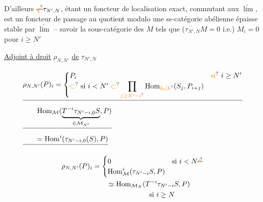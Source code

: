 
D'ailleurs $\deleted{\unsure{q}}\tau_{N',N}$, étant un foncteur de localisation exact, commutant aux $\underrightarrow{\lim}$, est un foncteur de passage au quotient modulo une ss-catégorie abélienne épaisse stable par $\underrightarrow{\lim}$ -- savoir la sous-catégorie des $M$ \deleted{\unsure{(}} tels que  ($\tau_{N',N}M=0$ i.e.) $M_i=0$ pour $i\geq N'$

\uline{Adjoint à droit} $\rho_{N,N'}$ \uline{de} $\tau_{N',N}$



\[
\begin{aligned}
 &\deleted{\rho_{N,N'}(P)_i=\begin{cases}P_i&\text{\unsure{si} }i\geq N'\\
 \unsure{\subset}\ \text{si }i<N'\ \unsure{\subset}\displaystyle\prod_{\unsure{j\geq N'-i}}\operatorname{Hom}_{\unsure{k_0|k}}(S_j,P_{i+j})&\end{cases}}\\
 &\deleted{\qquad\operatorname{Hom}_{\mathcal M}(\underbrace{T^{-i}\tau_{N'-i,0}S}_{\in\mathcal M_{N'}},P)}\\
 &\deleted{\qquad=\operatorname{Hom}^i(\tau_{N'-i,0}(S),P)}
\end{aligned}
\]

\[
\begin{aligned}
 \rho_{N,N'}(P)_i&=\begin{cases}0&\text{si }i<N\deleted{\unsure{\prime}}\\
 \operatorname{Hom}_{\mathcal M}^i(\tau_{N'-i}S,P)&\end{cases}\\
 &\qquad\simeq\operatorname{Hom}_{\mathcal M_N}(T^{-i}\tau_{N'-i}S,P)\\
 &\hspace{8em}\text{si }i\geq N
\end{aligned}
\]

